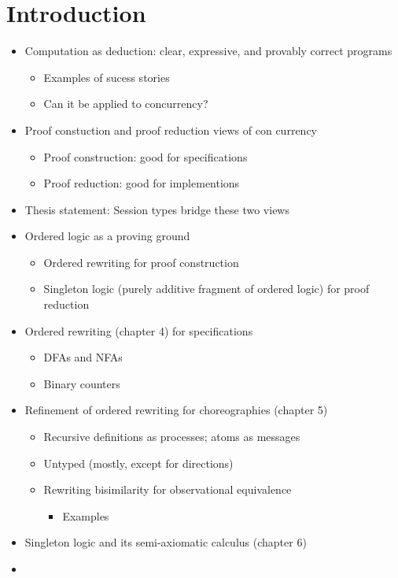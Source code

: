\chapter{Introduction}\label{ch:introduction}

\begin{itemize}
\item Computation as deduction: clear, expressive, and provably correct programs
  \begin{itemize}
  \item Examples of sucess stories
  \item Can it be applied to concurrency?
  \end{itemize}
\item Proof constuction and proof reduction views of con currency
  \begin{itemize}
  \item Proof construction: good for specifications 
  \item Proof reduction: good for implementions 
  \end{itemize}
\item Thesis statement: Session types bridge these two views
\item Ordered logic as a proving ground 
  \begin{itemize}
  \item Ordered rewriting for proof construction
  \item Singleton logic (purely additive fragment of ordered logic) for proof reduction
  \end{itemize}
\item Ordered rewriting (chapter 4) for specifications
  \begin{itemize}
  \item DFAs and NFAs 
  \item Binary counters
  \end{itemize}
\item Refinement of ordered rewriting for choreographies (chapter 5)
  \begin{itemize}
  \item Recursive definitions as processes; atoms as messages 
  \item Untyped (mostly, except for directions)
  \item Rewriting bisimilarity for observational equivalence
    \begin{itemize}
    \item Examples
    \end{itemize}
  \end{itemize}
\item Singleton logic and its semi-axiomatic calculus (chapter 6)
\item 
\end{itemize}



